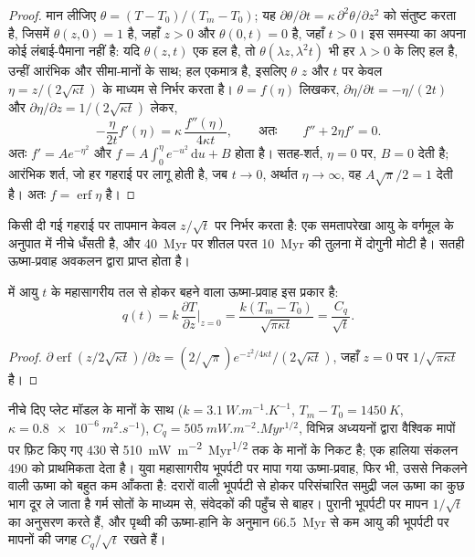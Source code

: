 \begin{proof}
मान लीजिए $\theta = (T - T_0)/(T_m - T_0)$; यह $\partial\theta/\partial t =
\kappa\,\partial^2\theta/\partial z^2$ को संतुष्ट करता है, जिसमें $\theta(z, 0) = 1$ है, जहाँ $z > 0$ और
$\theta(0, t) = 0$ है, जहाँ $t > 0$। इस समस्या का अपना कोई लंबाई-पैमाना नहीं है:
यदि $\theta(z, t)$ एक हल है, तो $\theta(\lambda z, \lambda^2t)$ भी हर
$\lambda > 0$ के लिए हल है, उन्हीं आरंभिक और सीमा-मानों के साथ; हल
एकमात्र है, इसलिए $\theta$ $z$ और $t$ पर केवल $\eta = z/(2\sqrt{\kappa
t})$ के माध्यम से निर्भर करता है। $\theta = f(\eta)$ लिखकर, $\partial\eta/\partial t = -\eta/(2t)$ और
$\partial\eta/\partial z = 1/(2\sqrt{\kappa t})$ लेकर,
\[
  -\frac{\eta}{2t}f'(\eta) = \kappa\,\frac{f''(\eta)}{4\kappa t},
  \qquad\text{अतः}\qquad f'' + 2\eta f' = 0 .
\]
अतः $f' = Ae^{-\eta^2}$ और $f = A\int_0^\eta e^{-u^2}\,\mathrm du + B$ होता है।
सतह-शर्त, $\eta = 0$ पर, $B = 0$ देती है; आरंभिक शर्त, जो
हर गहराई पर लागू होती है, जब $t \to 0$, अर्थात $\eta \to \infty$, वह
$A\sqrt\pi/2 = 1$ देती है। अतः $f = \operatorname{erf}\eta$ है।
\end{proof}

किसी दी गई गहराई पर तापमान केवल $z/\sqrt t$ पर निर्भर करता है: एक समतापरेखा
आयु के वर्गमूल के अनुपात में नीचे धँसती है, और \qty{40}{Myr} पर शीतल परत
\qty{10}{Myr} की तुलना में दोगुनी मोटी है। सतही ऊष्मा-प्रवाह अवकलन द्वारा प्राप्त होता है।

\begin{proposition}[ऊष्मा-प्रवाह--आयु संबंध]\label{prop:b3:lithosphere-thermal-models:heat-flow}
 में आयु $t$ के महासागरीय तल से होकर बहने वाला
ऊष्मा-प्रवाह इस प्रकार है:
\[
  q(t) = k\,\frac{\partial T}{\partial z}\Big|_{z=0}
  = \frac{k(T_m - T_0)}{\sqrt{\pi\kappa t}} = \frac{C_q}{\sqrt t} .
\]
\end{proposition}

\begin{proof}
$\partial\operatorname{erf}(z/2\sqrt{\kappa t})/\partial z = (2/\sqrt\pi)
e^{-z^2/4\kappa t}/(2\sqrt{\kappa t})$, जहाँ $z = 0$ पर $1/\sqrt{\pi\kappa
t}$ है।
\end{proof}

नीचे दिए प्लेट मॉडल के मानों के साथ ($k = \qty{3.1}{W.m^{-1}.K^{-1}}$,
$T_m - T_0 = \qty{1450}{K}$, $\kappa = \qty{0.8e-6}{m^2.s^{-1}}$), $C_q =
\qty{505}{mW.m^{-2}.Myr^{1/2}}$, विभिन्न अध्ययनों द्वारा वैश्विक मापों पर फ़िट किए गए 430 से
\qty{510}{mW.m^{-2}.Myr^{1/2}} तक के मानों के निकट है;
एक हालिया संकलन \num{490} को प्राथमिकता देता है। युवा महासागरीय भूपर्पटी पर मापा गया
ऊष्मा-प्रवाह, फिर भी, उससे निकलने वाली ऊष्मा को बहुत कम आँकता है:
दरारों वाली भूपर्पटी से होकर परिसंचारित समुद्री जल ऊष्मा का कुछ भाग दूर ले जाता है
गर्म सोतों के माध्यम से, संवेदकों की पहुँच से बाहर। पुरानी भूपर्पटी पर मापन
$1/\sqrt t$ का अनुसरण करते हैं, और पृथ्वी की ऊष्मा-हानि के अनुमान
\qty{66.5}{Myr} से कम आयु की भूपर्पटी पर मापनों की जगह $C_q/\sqrt t$ रखते हैं।

